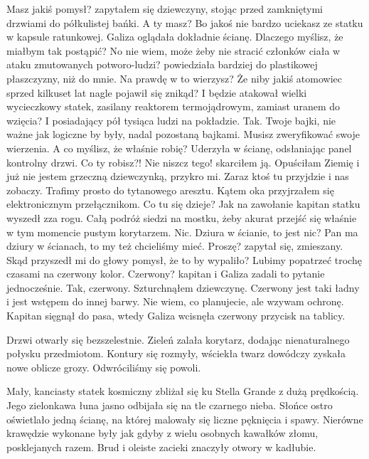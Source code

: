 \begin{dialogue}
	\ds{} Masz jakiś pomysł? \dm{} zapytałem się dziewczyny, stojąc przed zamkniętymi drzwiami do półkulistej bańki.
	\ds{} A ty masz? Bo jakoś nie bardzo uciekasz ze statku w kapsule ratunkowej. \dm{} Galiza oglądała dokładnie ścianę.
	\ds{} Dlaczego myślisz, że miałbym tak postąpić?
	\ds{} No nie wiem, może żeby nie stracić członków ciała w ataku zmutowanych potworo-ludzi? \dm{} powiedziała bardziej do plastikowej płaszczyzny, niż do mnie.
	\ds{} Na prawdę w to wierzysz? Że niby jakiś atomowiec sprzed kilkuset lat nagle pojawił się znikąd? I będzie atakował wielki wycieczkowy statek, zasilany reaktorem termojądrowym, zamiast uranem do wzięcia?
	\ds{} I posiadający pół tysiąca ludzi na pokładzie. Tak.
	\ds{} Twoje bajki, nie ważne jak logiczne by były, nadal pozostaną bajkami. Musisz zweryfikować swoje wierzenia.
	\ds{} A co myślisz, że właśnie robię? \dm{} Uderzyła w ścianę, odsłaniając panel kontrolny drzwi.
	\ds{} Co ty robisz?! Nie niszcz tego! \dm{} skarciłem ją.
	\ds{} Opuściłam Ziemię i już nie jestem grzeczną dziewczynką, przykro mi.
	\ds{} Zaraz ktoś tu przyjdzie i nas zobaczy. Trafimy prosto do tytanowego aresztu. \dm{} Kątem oka przyjrzałem się elektronicznym przełącznikom.
	\ds{} Co tu się dzieje? \dm{} Jak na zawołanie kapitan statku wyszedł zza rogu. Całą podróż siedzi na mostku, żeby akurat przejść się właśnie w tym momencie pustym korytarzem.
	\ds{} Nic.
	\ds{} Dziura w ścianie, to jest nic?
	\ds{} Pan ma dziury w ścianach, to my też chcieliśmy mieć. 
	\ds{} Proszę? \dm{} zapytał się, zmieszany. Skąd przyszedł mi do głowy pomysł, że to by wypaliło?
	\ds{} Lubimy popatrzeć trochę czasami na czerwony kolor.
	\ds{} Czerwony? \dm{} kapitan i Galiza zadali to pytanie jednocześnie.
	\ds{} Tak, czerwony. \dm{} Szturchnąłem dziewczynę. \dm{} Czerwony jest taki ładny i jest wstępem do innej barwy.
	\ds{} Nie wiem, co planujecie, ale wzywam ochronę. \dm{} Kapitan sięgnął do pasa, wtedy Galiza wcisnęła czerwony przycisk na tablicy.
\end{dialogue}

Drzwi otwarły się bezszelestnie.
Zieleń zalała korytarz, dodając nienaturalnego połysku przedmiotom.
Kontury się rozmyły, wściekła twarz dowódczy zyskała nowe oblicze grozy.
Odwróciliśmy się powoli.

Mały, kanciasty statek kosmiczny zbliżał się ku Stella Grande z dużą prędkością.
Jego zielonkawa łuna jasno odbijała się na tle czarnego nieba.
Słońce ostro oświetlało jedną ścianę, na której malowały się liczne pęknięcia i spawy.
Nierówne krawędzie wykonane były jak gdyby z wielu osobnych kawałków złomu, posklejanych razem.
Brud i oleiste zacieki znaczyły otwory w kadłubie.

